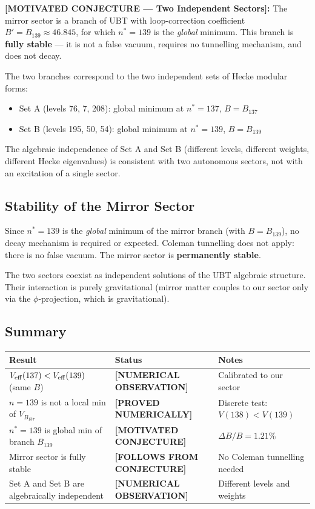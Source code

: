 \documentclass[12pt]{article}
\theoremstyle{definition}
\theoremstyle{remark}
\begin{document}
\begin{conjecturebox}
\textbf{[MOTIVATED CONJECTURE --- Two Independent Sectors]:}
The mirror sector is a branch of UBT with loop-correction coefficient
$B' = B_{139} \approx 46.845$, for which $n^* = 139$ is the \emph{global}
minimum.  This branch is \textbf{fully stable} --- it is not a false vacuum,
requires no tunnelling mechanism, and does not decay.

The two branches correspond to the two independent sets of Hecke modular forms:
\begin{itemize}
  \item Set A (levels 76, 7, 208): global minimum at $n^* = 137$, $B = B_{137}$
  \item Set B (levels 195, 50, 54): global minimum at $n^* = 139$, $B = B_{139}$
\end{itemize}
The algebraic independence of Set A and Set B (different levels, different weights,
different Hecke eigenvalues) is consistent with two autonomous sectors, not with
an excitation of a single sector.
\end{conjecturebox}

\subsection{Stability of the Mirror Sector}

Since $n^* = 139$ is the \emph{global} minimum of the mirror branch
(with $B = B_{139}$), no decay mechanism is required or expected.
Coleman tunnelling does not apply: there is no false vacuum.
The mirror sector is \textbf{permanently stable}.

The two sectors coexist as independent solutions of the UBT algebraic
structure.  Their interaction is purely gravitational (mirror matter couples
to our sector only via the $\phi$-projection, which is gravitational).

\subsection{Summary}

\begin{center}
\renewcommand{\arraystretch}{1.3}
\begin{tabular}{lll}
\toprule
\textbf{Result} & \textbf{Status} & \textbf{Notes} \\
\midrule
$V_{\rm eff}(137) < V_{\rm eff}(139)$ (same $B$) & \textbf{[NUMERICAL OBSERVATION]} &
  Calibrated to our sector \\
$n=139$ is not a local min of $V_{B_{137}}$ & \textbf{[PROVED NUMERICALLY]} &
  Discrete test: $V(138) < V(139)$ \\
$n^*=139$ is global min of branch $B_{139}$ & \textbf{[MOTIVATED CONJECTURE]} &
  $\Delta B/B = 1.21\%$ \\
Mirror sector is fully stable & \textbf{[FOLLOWS FROM CONJECTURE]} &
  No Coleman tunnelling needed \\
Set A and Set B are algebraically independent & \textbf{[NUMERICAL OBSERVATION]} &
  Different levels and weights \\
\bottomrule
\end{tabular}
\end{center}
\end{document}
